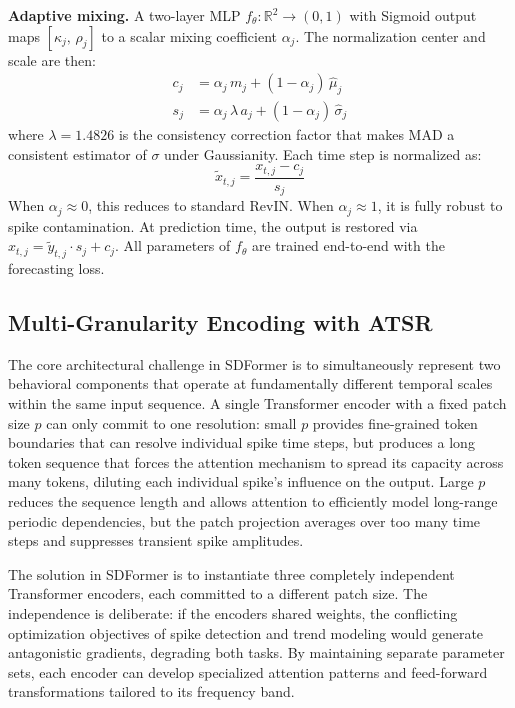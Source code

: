 \documentclass[journal]{IEEEtran}
\begin{document}
\textbf{Adaptive mixing.}
A two-layer MLP $f_\theta : \mathbb{R}^2 \to (0,1)$ with Sigmoid output maps
$[\kappa_j,\, \rho_j]$ to a scalar mixing coefficient $\alpha_j$.
The normalization center and scale are then:
\begin{align}
c_j &= \alpha_j\, m_j + (1 - \alpha_j)\,\hat{\mu}_j
\label{eq:center} \\
s_j &= \alpha_j\, \lambda\, a_j + (1 - \alpha_j)\,\hat{\sigma}_j
\label{eq:scale}
\end{align}
where $\lambda = 1.4826$ is the consistency correction factor that makes MAD
a consistent estimator of $\sigma$ under Gaussianity.
Each time step is normalized as:
\begin{equation}
\tilde{x}_{t,j} = \frac{x_{t,j} - c_j}{s_j}
\label{eq:norm}
\end{equation}
When $\alpha_j \approx 0$, this reduces to standard RevIN.
When $\alpha_j \approx 1$, it is fully robust to spike contamination.
At prediction time, the output is restored via
$\hat{x}_{t,j} = \tilde{y}_{t,j} \cdot s_j + c_j$.
All parameters of $f_\theta$ are trained end-to-end with the forecasting
loss.

\subsection{Multi-Granularity Encoding with ATSR}

The core architectural challenge in SDFormer is to simultaneously represent
two behavioral components that operate at fundamentally different temporal
scales within the same input sequence.
A single Transformer encoder with a fixed patch size $p$ can only commit
to one resolution: small $p$ provides fine-grained token boundaries that
can resolve individual spike time steps, but produces a long token sequence
that forces the attention mechanism to spread its capacity across many
tokens, diluting each individual spike's influence on the output.
Large $p$ reduces the sequence length and allows attention to efficiently
model long-range periodic dependencies, but the patch projection averages
over too many time steps and suppresses transient spike amplitudes.

The solution in SDFormer is to instantiate three completely independent
Transformer encoders, each committed to a different patch size.
The independence is deliberate: if the encoders shared weights, the
conflicting optimization objectives of spike detection and trend modeling
would generate antagonistic gradients, degrading both tasks.
By maintaining separate parameter sets, each encoder can develop
specialized attention patterns and feed-forward transformations tailored
to its frequency band.
\end{document}

